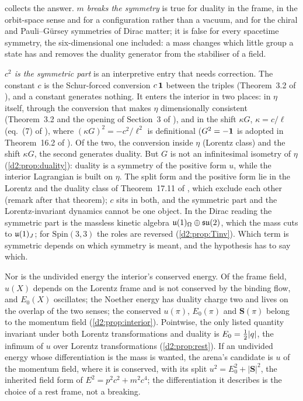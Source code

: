  collects the answer. \emph{$m$ breaks the symmetry} is true for duality in the frame, in the orbit-space sense and for a
configuration rather than a vacuum, and for the chiral and Pauli--G\"ursey symmetries of Dirac matter; it is false for every spacetime symmetry,
the six-dimensional one included: a mass changes which little group a state has and removes the duality generator from the stabiliser of a field.

\emph{$c^2$ is the symmetric part} is an interpretive entry that needs correction. The constant $c$ is the Schur-forced conversion $c\,\mathbf 1$
between the triples (Theorem~3.2 of \cite{ES17}), and a constant generates nothing. It enters the interior in two places: in $\eta$ itself,
through the conversion that makes $\eta$ dimensionally consistent (Theorem~3.2 and the opening of Section~3 of \cite{ES17}), and in the shift
$\kappa G$, $\kappa=c/\ell$ (eq.~(7) of \cite{ES17}), where $(\kappa G)^2=-c^2/\ell^2$ is definitional ($G^2=-\mathbf 1$ is adopted in Theorem~16.2 of
\cite{ES17}). Of the two, the conversion inside $\eta$ (Lorentz class) and the shift $\kappa G$, the second generates duality. But $G$ is not an
infinitesimal isometry of $\eta$ (\cref{d2:prop:duality}): duality is a symmetry of the positive form $u$, while the interior Lagrangian is built on
$\eta$. The split form and the positive form lie in the Lorentz and the duality class of Theorem~17.11 of \cite{ES17}, which exclude each other
(remark after that theorem); $c$ sits in both, and the symmetric part and the Lorentz-invariant dynamics cannot be one object. In the Dirac reading the symmetric part is
the massless kinetic algebra $\mathfrak{u}(1)_\Omega\oplus\mathfrak{su}(2)$, which the mass cuts to $\mathfrak{u}(1)_J$; for $\mathrm{Spin}(3,3)$ the roles are reversed
(\cref{d2:prop:Tinv}). Which term is symmetric depends on which symmetry is meant, and the hypothesis has to say which.

Nor is the undivided energy the interior's conserved energy. Of the frame field, $u(X)$ depends on the Lorentz frame and is not conserved by the
binding flow, and $E_0(X)$ oscillates; the Noether energy has duality charge two and lives on the overlap of the two senses; the conserved
$u(\pi)$, $E_0(\pi)$ and $\mathbf S(\pi)$ belong to the momentum field (\cref{d2:prop:interior}). Pointwise, the only listed quantity invariant under
both Lorentz transformations and duality is $E_0=\tfrac12|q|$, the infimum of $u$ over Lorentz transformations (\cref{d2:prop:rest}). If an undivided
energy whose differentiation is the mass is wanted, the arena's candidate is $u$ of the momentum field, where it is conserved, with its split
$u^2=E_0^2+|\mathbf S|^2$, the inherited field form of $E^2=p^2c^2+m^2c^4$; the differentiation it describes is the choice of a rest frame, not a
breaking.

